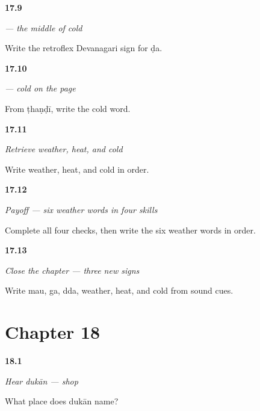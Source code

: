 \noindent\begin{minipage}[t]{\linewidth}
\raggedright
\hypertarget{review-MW-W12-dda-write}{\textbf{17.9}} \emph{ — the middle of cold}\par
\small Write the retroflex Devanagari sign for ḍa.
\end{minipage}\par\medskip

\noindent\begin{minipage}[t]{\linewidth}
\raggedright
\hypertarget{review-MW-C12-thandi-dictation}{\textbf{17.10}} \emph{ — cold on the page}\par
\small From ṭhaṇḍī, write the cold word.
\end{minipage}\par\medskip

\noindent\begin{minipage}[t]{\linewidth}
\raggedright
\hypertarget{review-MW-R12-weather-new-three-recall}{\textbf{17.11}} \emph{Retrieve weather, heat, and cold}\par
\small Write weather, heat, and cold in order.
\end{minipage}\par\medskip

\noindent\begin{minipage}[t]{\linewidth}
\raggedright
\hypertarget{review-MW-C12-weather-six-payoff}{\textbf{17.12}} \emph{Payoff — six weather words in four skills}\par
\small Complete all four checks, then write the six weather words in order.
\end{minipage}\par\medskip

\noindent\begin{minipage}[t]{\linewidth}
\raggedright
\hypertarget{review-MW-R12-script-close-recall}{\textbf{17.13}} \emph{Close the chapter — three new signs}\par
\small Write mau, ga, dda, weather, heat, and cold from sound cues.
\end{minipage}\par\medskip

\section*{Chapter 18}

\noindent\begin{minipage}[t]{\linewidth}
\raggedright
\hypertarget{review-MW-C13-hear-dukan-meaning}{\textbf{18.1}} \emph{Hear \emph{dukān} — shop}\par
\small What place does dukān name?
\end{minipage}\par\medskip

